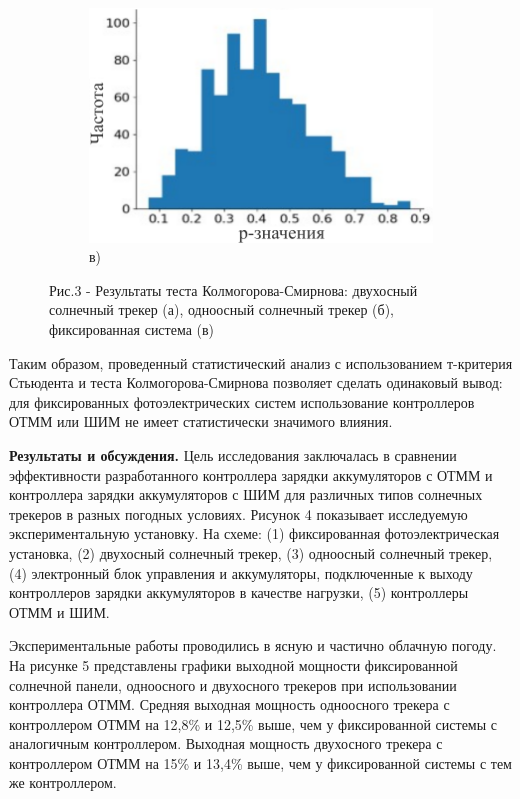\begin{figure}[H]
    \begin{subfigure}[b]{0.45\textwidth}
        \centering
        \includegraphics[width=\textwidth]{media/ict/image9}
        \caption*{в)}
    \end{subfigure}
    \caption*{Рис.3 - Результаты теста Колмогорова-Смирнова: двухосный солнечный трекер (а), одноосный солнечный трекер (б), фиксированная система (в)}
\end{figure}

\begin{multicols}{2}
Таким образом, проведенный статистический анализ с использованием
т-критерия Стьюдента и теста Колмогорова-Смирнова позволяет сделать
одинаковый вывод: для фиксированных фотоэлектрических систем
использование контроллеров ОТММ или ШИМ не имеет статистически значимого
влияния.

{\bfseries Результаты и обсуждения.} Цель исследования заключалась в
сравнении эффективности разработанного контроллера зарядки аккумуляторов
с ОТММ и контроллера зарядки аккумуляторов с ШИМ для различных типов
солнечных трекеров в разных погодных условиях. Рисунок 4 показывает
исследуемую экспериментальную установку. На схеме: (1) фиксированная
фотоэлектрическая установка, (2) двухосный солнечный трекер, (3)
одноосный солнечный трекер, (4) электронный блок управления и
аккумуляторы, подключенные к выходу контроллеров зарядки аккумуляторов в
качестве нагрузки, (5) контроллеры ОТММ и ШИМ.

Экспериментальные работы проводились в ясную и частично облачную погоду.
На рисунке 5 представлены графики выходной мощности фиксированной
солнечной панели, одноосного и двухосного трекеров при использовании
контроллера ОТММ. Средняя выходная мощность одноосного трекера с
контроллером ОТММ на 12,8\% и 12,5\% выше, чем у фиксированной системы с
аналогичным контроллером. Выходная мощность двухосного трекера с
контроллером ОТММ на 15\% и 13,4\% выше, чем у фиксированной системы с
тем же контроллером.
\end{multicols}

